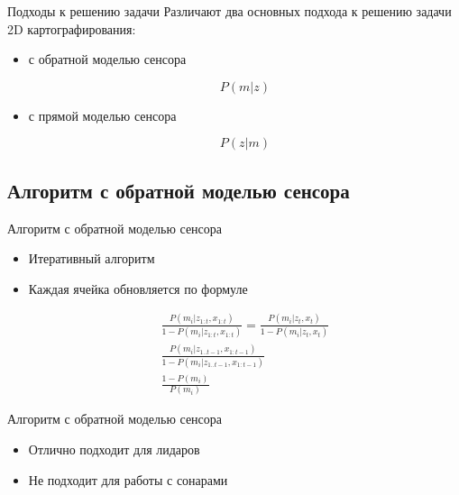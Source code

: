 \documentclass[9pt]{beamer}
\begin{document}
\begin{frame}{Подходы к решению задачи}
Различают два основных подхода к решению задачи 2D картографирования:
\begin{itemize}
  \item
  {
    с обратной моделью сенсора

    $$P(m|z)$$
  }
  \item
  {
    с прямой моделью сенсора

    $$P(z|m)$$
  }
\end{itemize}

\end{frame}

\subsection{Алгоритм с обратной моделью сенсора}

\begin{frame}{Алгоритм с обратной моделью сенсора}

\begin{itemize}
  \item
  {
    Итеративный алгоритм
  }
  \item
  {
    Каждая ячейка обновляется по формуле

    \begin{equation}
      \begin{split}
        \frac{P(m_i | z_{1:t}, x_{1:t})}{1 - P(m_i | z_{1:t}, x_{1:t})} = 
        \frac{P(m_i | z_t, x_t)}{1- P(m_i | z_t, x_t)}\\
        \frac{P(m_i | z_{1..t-1}, x_{1:t-1})}{1- P(m_i | z_{1..t-1}, x_{1:t-1})}\\
        \frac{1 - P(m_i)}{P(m_{i})}
      \end{split}
    \end{equation}
  }
\end{itemize}
\end{frame}

\begin{frame}{Алгоритм с обратной моделью сенсора}

\begin{itemize}
  \item
  {
    Отлично подходит для лидаров
  }
  \item
  {
    Не подходит для работы с сонарами
  }
\end{itemize}
\end{frame}
\end{document}
